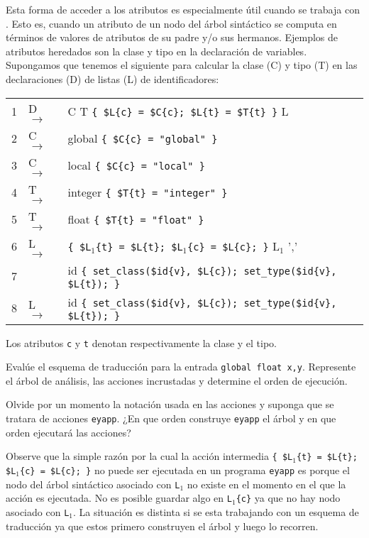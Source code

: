 Esta forma de acceder a los atributos es especialmente útil cuando se 
trabaja con . Esto es, cuando un atributo
de un nodo del árbol sintáctico se computa en términos
de valores de atributos de su padre y/o sus hermanos.
Ejemplos de atributos heredados son la clase y tipo en la declaración
de variables. Supongamos que tenemos el siguiente 
 para calcular la clase (C) y tipo (T) en 
las declaraciones (D) de listas (L) de identificadores:

\vspace{0.5cm}
\begin{center}
\begin{tabular}{|l|ll|}
\hline
1 & D $\rightarrow$& C T \verb|{ $L{c} = $C{c}; $L{t} = $T{t} }| L\\
2 & C $\rightarrow$& global   \verb|{ $C{c} = "global" }|\\
3 & C $\rightarrow$& local    \verb|{ $C{c} = "local" }|\\
4 & T $\rightarrow$& integer  \verb|{ $T{t} = "integer" }|\\
5 & T $\rightarrow$& float    \verb|{ $T{t} = "float" }|\\
6 & L $\rightarrow$& \verb|{ $L|$_1$\verb|{t} = $L{t}; $L|$_1$\verb|{c} = $L{c}; }| L$_1$ ','\\
7 &                & id \verb|{ set_class($id{v}, $L{c}); set_type($id{v}, $L{t}); }|\\
8 & L $\rightarrow$& id   \verb|{ set_class($id{v}, $L{c}); set_type($id{v}, $L{t}); }|\\
\hline
\end{tabular}
\end{center}
\vspace{0.25cm}

Los atributos \verb|c| y \verb|t| denotan respectivamente
la clase y el tipo. 

\begin{exercise}
Evalúe el esquema de traducción para la entrada
\verb|global float x,y|. Represente el árbol de análisis, las
acciones incrustadas y determine el orden de ejecución.

Olvide por un momento la notación usada en las acciones y 
suponga que se tratara de acciones \verb|eyapp|. ¿En que orden
construye \verb|eyapp| el árbol y en que orden ejecutará las
acciones?
\end{exercise}

Observe que la simple razón por la cual la acción intermedia
\verb|{ $L|$_1$\verb|{t} = $L{t}; $L|$_1$\verb|{c} = $L{c}; }|
no puede ser ejecutada en un programa \verb|eyapp| es porque 
el nodo
del árbol sintáctico asociado con {\tt L}$_1$ no existe
en el momento en el que la acción es ejecutada. No es posible
guardar algo en {\tt L}$_1$\verb|{c}| ya que no hay nodo asociado
con {\tt L}$_1$. 
La situación es 
distinta si se esta trabajando con un esquema de traducción
ya que estos primero construyen el árbol y luego lo recorren.

